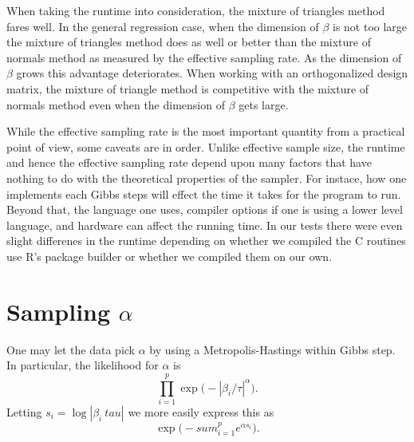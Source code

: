 \documentclass{article}
\begin{document}
When taking the runtime into consideration, the mixture of triangles method
fares well.  In the general regression case, when the dimension of $\beta$ is
not too large the mixture of triangles method does as well or better than the
mixture of normals method as measured by the effective sampling rate.  As the
dimension of $\beta$ grows this advantage deteriorates.  When working with an
orthogonalized design matrix, the mixture of triangle method is competitive with
the mixture of normals method even when the dimension of $\beta$ gets large.

While the effective sampling rate is the most important quantity from a
practical point of view, some caveats are in order.  Unlike effective sample
size, the runtime and hence the effective sampling rate depend upon many factors
that have nothing to do with the theoretical properties of the sampler.  For
instace, how one implements each Gibbs steps will effect the time it takes for
the program to run.  Beyond that, the language one uses, compiler options if one
is using a lower level language, and hardware can affect the running time.  In
our tests there were even slight differenes in the runtime depending on whether
we compiled the C routines use R's package builder or whether we compiled them
on our own.

\section{Sampling $\alpha$}

One may let the data pick $\alpha$ by using a Metropolis-Hastings within Gibbs
step.  In particular, the likelihood for $\alpha$ is
\[
\prod_{i=1}^p \exp \Big( - |\beta_i / \tau|^\alpha \Big).
\]
Letting $s_i = \log |\beta_i \ tau|$ we more easily express this as
\[
\exp \Big( - sum_{i=1}^p e^{\alpha s_i} \Big).
\]


{}

\end{document}
